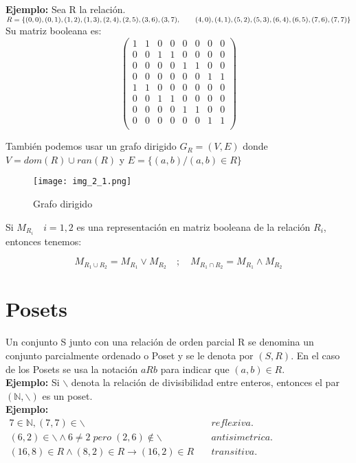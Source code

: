 \textbf{Ejemplo: } Sea R la relación.\\
$R=\lbrace(0,0),(0,1),(1,2),(1,3),(2,4),(2,5),(3,6),(3,7),\\
 \quad\quad(4,0),(4,1),(5,2),(5,3),(6,4),(6,5),(7,6),(7,7)\rbrace$\\
Su matriz booleana es:\\
$$\begin{pmatrix}
1 & 1 & 0 & 0 & 0 & 0 & 0 & 0\\
0 & 0 & 1 & 1 & 0 & 0 & 0 & 0\\
0 & 0 & 0 & 0 & 1 & 1 & 0 & 0\\
0 & 0 & 0 & 0 & 0 & 0 & 1 & 1\\
1 & 1 & 0 & 0 & 0 & 0 & 0 & 0\\
0 & 0 & 1 & 1 & 0 & 0 & 0 & 0\\
0 & 0 & 0 & 0 & 1 & 1 & 0 & 0\\
0 & 0 & 0 & 0 & 0 & 0 & 1 & 1\\
\end{pmatrix}$$

También podemos usar un grafo dirigido $G_R=(V,E)$ donde $V=dom(R)\cup ran(R)$ y $E=\lbrace(a,b)/(a,b)\in R\rbrace$\\
\begin{figure}
\centering
\texttt{[image: img\_2\_1.png]} 
\caption{Grafo dirigido}
\end{figure}


Si $M_{R_i} \quad i=1,2$ es una representación en matriz booleana de la relación $R_i$, entonces tenemos:

$$M_{R_1\cup R_2}=M_{R_1}\lor M_{R_2}\quad ; \quad
M_{R_1\cap R_2}=M_{R_1}\land M_{R_2}$$

\section{Posets}
Un conjunto S junto con una relación de orden parcial R se denomina un conjunto parcialmente ordenado o Poset y se le denota por $(S,R)$. En el caso de los Posets se usa la notación $aRb$ para indicar que $(a,b)\in R$.\\
\textbf{Ejemplo: } Si $\backslash$ denota la relación de divisibilidad entre enteros, entonces el par $(\mathds{N},\backslash)$ es un poset.\\
\textbf{Ejemplo: }\\
$\begin{array}{rl}7\in \mathds{N}, (7,7)\in \backslash \quad & reflexiva.\\
(6,2)\in \backslash \land 6\not=2 \; pero\; (2,6)\not\in \backslash \quad & antisimetrica.\\
(16,8)\in R \land (8,2)\in R \rightarrow (16,2)\in R \quad & transitiva.\end{array}$\\
 
